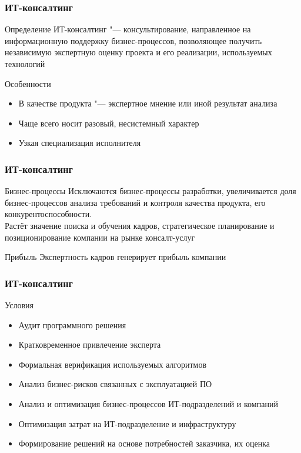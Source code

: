 \documentclass{../industrial-development}
\begin{document}
\begin{frame} \frametitle{ИТ-консалтинг}
	\begin{block}{Определение}
		\alert{ИТ-консалтинг} "--- консультирование, направленное на  информационную поддержку бизнес-процессов, позволяющее получить независимую экспертную оценку проекта и его реализации, используемых технологий
	\end{block}
	\begin{block}{Особенности}
		\begin{itemize}
			\item В качестве продукта "--- экспертное мнение или иной результат анализа
			\item Чаще всего носит разовый, несистемный характер
			\item Узкая специализация исполнителя
		\end{itemize}
	\end{block}
\end{frame}
\lecturenotes


\begin{frame} \frametitle{ИТ-консалтинг}
	\begin{block}{Бизнес-процессы}
		Исключаются бизнес-процессы разработки, увеличивается доля бизнес-процессов анализа требований и контроля качества продукта, его конкурентоспособности.\\
		Растёт значение поиска и обучения кадров, стратегическое планирование и позиционирование компании на рынке консалт-услуг
	\end{block}
	\begin{block}{Прибыль}
		Экспертность кадров генерирует прибыль компании
	\end{block}
\end{frame}
\lecturenotes


\begin{frame} \frametitle{ИТ-консалтинг}
	\begin{block}{Условия}
		\begin{itemize}
			\item Аудит программного решения
			\item Кратковременное привлечение эксперта
			\item Формальная верификация используемых алгоритмов
			\item Анализ бизнес-рисков связанных с эксплуатацией ПО
			\item Анализ и оптимизация бизнес-процессов ИТ-подразделений и компаний
			\item Оптимизация затрат на ИТ-подразделение и инфраструктуру
			\item Формирование решений на основе потребностей заказчика, их оценка
		\end{itemize}
	\end{block}
\end{frame}
\lecturenotes
\end{document}
